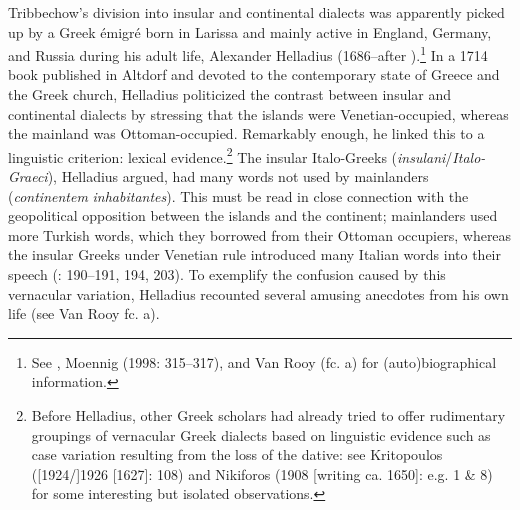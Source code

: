 \documentclass[output=paper]{langsci/langscibook}
\begin{document}
Tribbechow’s division into insular and continental dialects was apparently picked up by a Greek émigré born in Larissa and mainly active in England, Germany, and Russia during his adult life, Alexander Helladius (1686–after \citealt{September1715}).\footnote{See \citet{Helladius1714}, Moennig (1998: 315–317), and Van Rooy (fc. a) for (auto)biographical information.} In a 1714 book published in Altdorf and devoted to the contemporary state of Greece and the Greek church, Helladius politicized the contrast between insular and continental dialects by stressing that the islands were Venetian-occupied, whereas the mainland was Ottoman-occupied. Remarkably enough, he linked this to a linguistic criterion: lexical evidence.\footnote{Before Helladius, other Greek scholars had already tried to offer rudimentary groupings of vernacular Greek dialects based on linguistic evidence such as case variation resulting from the loss of the dative: see Kritopoulos ([1924/]1926 [1627]: 108) and Nikiforos (1908 [writing ca. 1650]: e.g. 1 \& 8) for some interesting but isolated observations.} The insular Italo-Greeks (\textit{insulani}/\textit{Italo-Graeci}), Helladius argued, had many words not used by mainlanders (\textit{continentem} \textit{inhabitantes}). This must be read in close connection with the geopolitical opposition between the islands and the continent; mainlanders used more Turkish words, which they borrowed from their Ottoman occupiers, whereas the insular Greeks under Venetian rule introduced many Italian words into their speech (\citealt{Helladius1714}: 190–191, 194, 203). To exemplify the confusion caused by this vernacular variation, Helladius recounted several amusing anecdotes from his own life (see Van Rooy fc. a).
\end{document}
